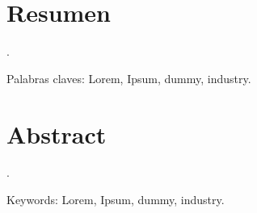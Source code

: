 \chapter*{Resumen}
\label{resumen}

\par \lipsum[1-1].\\

\par Palabras claves: Lorem, Ipsum, dummy, industry.

\chapter*{Abstract}
\label{abstract}
\par \lipsum[1-1].\\

\par Keywords: Lorem, Ipsum, dummy, industry.